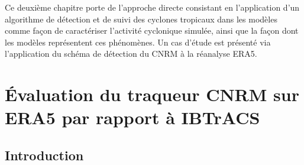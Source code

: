 \documentclass[../main.tex]{subfiles}
\begin{document}
\begin{itshape}
Ce deuxième chapitre porte de l'approche directe consistant en l'application d'un algorithme de détection et de suivi des cyclones tropicaux dans les modèles
comme façon de caractériser l'activité cyclonique simulée, ainsi que la façon dont les modèles représentent ces phénomènes. Un cas d'étude est présenté via
l'application du schéma de détection du CNRM à la réanalyse ERA5.
\end{itshape}

\minitoc\newpage
\section{Évaluation du traqueur CNRM sur ERA5 par rapport à IBTrACS}\label{sec:eval_tracker_ERA5}

\subsection{Introduction}
\end{document}
